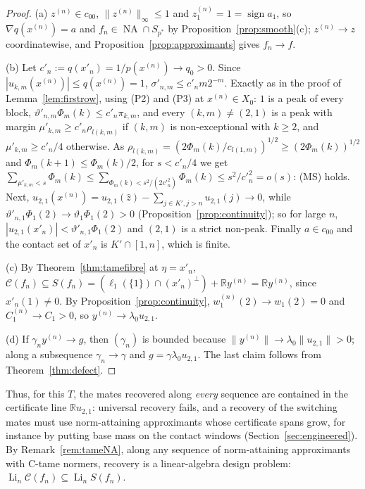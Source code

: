 \documentclass[10pt]{amsart}
\theoremstyle{definition}
\theoremstyle{remark}
\newcommand{\NA}{\operatorname{NA}}
\newcommand{\sgn}{\operatorname{sign}}
\newcommand{\R}{\mathbb R}
\newcommand{\Cset}{\mathcal C}
\newcommand{\Li}{\operatorname*{Li}}
\newcommand{\zh}{\hat z}
\begin{document}
\begin{proof}
(a) $z^{(n)}\in c_{00}$, $\|z^{(n)}\|_\infty\le1$ and $z^{(n)}_1=1=\sgn a_1$,
so $\nabla q(x^{(n)})=a$ and $f_n\in\NA\cap S_{p^*}$ by
Proposition~\ref{prop:smooth}(c); $z^{(n)}\to z$ coordinatewise, and
Proposition~\ref{prop:approximants} gives $f_n\to f$.

(b) Let $c'_n:=q(x'_n)=1/p(x^{(n)})\to q_0>0$.  Since $|u_{k,m}(x^{(n)})|
\le q(x^{(n)})=1$, $\sigma'_{n,m}\le c'_nm2^{-m}$.  Exactly as in the proof
of Lemma~\ref{lem:firstrow}, using (P2) and (P3) at $x^{(n)}\in X_0$: $1$ is a
peak of every block, $\vartheta'_{n,m}\Phi_m(k)\le c'_n\pi_{k,m}$, and every
$(k,m)\ne(2,1)$ is a peak with margin $\mu'_{k,m}\ge c'_n\rho_{l(k,m)}$ if
$(k,m)$ is non-exceptional with $k\ge2$, and $\mu'_{k,m}\ge c'_n/4$
otherwise.  As $\rho_{l(k,m)}=(2\Phi_m(k)/c_{l(1,m)})^{1/2}\ge(2\Phi_m(k))^{1/2}$
and $\Phi_m(k+1)\le\Phi_m(k)/2$, for $s<c'_n/4$ we get
$\sum_{\mu'_{k,m}<s}\Phi_m(k)\le\sum_{\Phi_m(k)<s^2/(2c'^2_n)}\Phi_m(k)\le
s^2/c'^2_n=o(s)$: (MS) holds.  Next,
$u_{2,1}(x^{(n)})=u_{2,1}(\zh)-\sum_{j\in K',j>n}u_{2,1}(j)\to0$, while
$\vartheta'_{n,1}\Phi_1(2)\to\vartheta_1\Phi_1(2)>0$
(Proposition~\ref{prop:continuity}); so for large $n$,
$|u_{2,1}(x'_n)|<\vartheta'_{n,1}\Phi_1(2)$ and $(2,1)$ is a strict
non-peak.  Finally $a\in c_{00}$ and the contact set of $x'_n$ is
$K'\cap[1,n]$, which is finite.

(c) By Theorem~\ref{thm:tamefibre} at $\eta=x'_n$,
$\Cset(f_n)\subseteq S(f_n)=(\ell_1(\{1\})\cap(x'_n)^\perp)+\R y^{(n)}=\R
y^{(n)}$, since $x'_n(1)\ne0$.  By Proposition~\ref{prop:continuity},
$w^{(n)}_1(2)\to w_1(2)=0$ and $C^{(n)}_1\to C_1>0$, so $y^{(n)}\to
\lambda_0u_{2,1}$.

(d) If $\gamma_ny^{(n)}\to g$, then $(\gamma_n)$ is bounded because
$\|y^{(n)}\|\to\lambda_0\|u_{2,1}\|>0$; along a subsequence $\gamma_n\to\gamma$
and $g=\gamma\lambda_0u_{2,1}$.  The last claim follows from
Theorem~\ref{thm:defect}.
\end{proof}

Thus, for this $T$, the mates recovered along \emph{every} sequence are
contained in the certificate line $\R u_{2,1}$: universal recovery fails, and
a recovery of the switching mates must use norm-attaining approximants whose
certificate spans grow, for instance by putting base mass on the contact
windows (Section~\ref{sec:engineered}).  By Remark~\ref{rem:tameNA}, along
any sequence of norm-attaining approximants with C-tame normers, recovery is
a linear-algebra design problem: $\Li_n\Cset(f_n)\subseteq\Li_nS(f_n)$.
\end{document}
